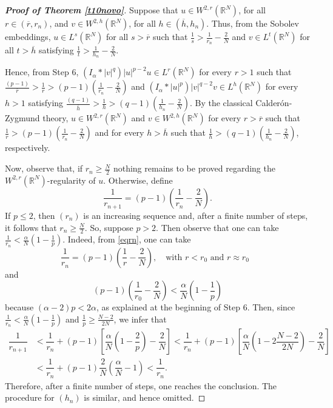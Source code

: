 \documentclass[12pt,a4paper]{article}
\numberwithin{equation}{section}
\begin{document}
\begin{proof}[\bf{Proof of Theorem \ref{t10novo}}]
Suppose that $u\in W^{2, r}(\mathbb{R}^N)$, for all $r\in (\overline{r}, r_n)$, and $v\in W^{2, h}(\mathbb{R}^N)$, for all $h\in (\overline{h}, h_n)$. Thus, from the Sobolev embeddings, $u\in L^{s}(\mathbb{R}^N)$ for all $s>\overline{r}$ such that $\frac{1}{s}>\frac{1}{r_n}-\frac{2}{N}$ and $v\in L^{t}(\mathbb{R}^N)$ for all $t>\overline{h}$ satisfying $\frac{1}{t}>\frac{1}{h_n}-\frac{2}{N}$. 

Hence, from Step 6, $(I_\alpha \ast |v|^q)|u|^{p-2}u \in L^{r}(\mathbb{R}^N)$ for every $r>1$ such that $\frac{(p-1)}{\overline{r}}> \frac{1}{r}>(p-1)\left(\frac{1}{r_n}-\frac{2}{N}\right) $ and $(I_\alpha \ast |u|^p)|v|^{q-2}v \in L^{h}(\mathbb{R}^N)$ for every $h>1$ satisfying  $\frac{(q-1)}{\overline{h}}> \frac{1}{h}>(q-1)\left(\frac{1}{h_n}-\frac{2}{N}\right) $. By the classical Calderón-Zygmund theory, $u\in W^{2,r}(\mathbb{R}^N)$ and $v\in W^{2,h}(\mathbb{R}^N)$ for every $r>\overline{r}$ such that $\frac{1}{r}>(p-1)\left(\frac{1}{r_n}-\frac{2}{N}\right)$ and for every $h>\overline{h}$ such that $\frac{1}{h}>(q-1)\left(\frac{1}{h_n}-\frac{2}{N}\right)$, respectively. 

Now, observe that, if $r_n \geq \frac{N}{2}$ nothing remains to be proved regarding the $W^{2,r}(\mathbb{R}^N)$-regularity of $u$. Otherwise, define
\begin{equation}\label{eqrn}
\dfrac{1}{r_{n+1}}= (p-1)\left(\frac{1}{r_n}-\frac{2}{N}\right).
\end{equation}
If $p\leq 2$, then $(r_n)$ is an increasing sequence and, after a finite number of steps, it follows that $r_n \geq \frac{N}{2}$. So, suppose $p>2$. Then observe that one can take $\frac{1}{r_n}<\frac{\alpha}{N}\left(1-\frac{1}{p}\right)$. Indeed, from \eqref{eqrn}, one can take
\[
\frac{1}{r_n} = (p-1)\left(\frac{1}{r}-\frac{2}{N}\right), \quad \text{with $r < r_0$ and $r\approx r_0$ }
\]
and
\[
(p-1)\left(\frac{1}{r_0}- \frac{2}{N}\right) < \frac{\alpha}{N}\left( 1 - \frac{1}{p} \right)
\]
because $(\alpha-2)p < 2\alpha$, as explained at the beginning of Step 6. Then, since $\frac{1}{r_n}<\frac{\alpha}{N}\left(1-\frac{1}{p}\right)$ and $\frac{1}{p}\geq \frac{N-2}{2N}$, we infer that
\begin{align*}
    \dfrac{1}{r_{n+1}} &< \dfrac{1}{r_n}+(p-1)\left[\dfrac{\alpha}{N}\left(1-\dfrac{2}{p}\right)-\dfrac{2}{N}\right]< \dfrac{1}{r_n}+(p-1)\left[\dfrac{\alpha}{N}\left(1-2\dfrac{N-2}{2N}\right)-\dfrac{2}{N}\right]\\
    &< \dfrac{1}{r_n}+(p-1)\dfrac{2}{N}\left(\dfrac{\alpha}{N}-1\right)< \dfrac{1}{r_n}.
\end{align*}
Therefore, after a finite number of steps, one reaches the conclusion. The procedure for $(h_n)$ is similar, and hence omitted.


\end{proof}
\end{document}
